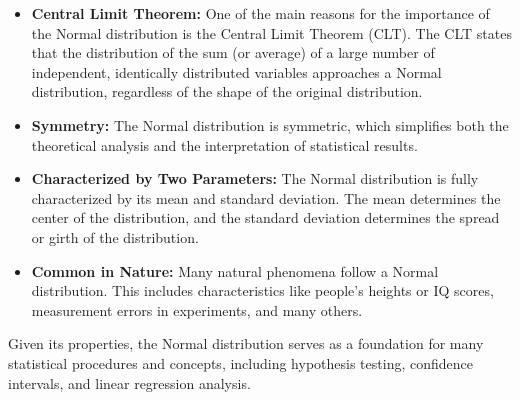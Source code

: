 \begin{itemize}
\item \textbf{Central Limit Theorem:} One of the main reasons for the importance of the Normal distribution is the Central Limit Theorem (CLT). The CLT states that the distribution of the sum (or average) of a large number of independent, identically distributed variables approaches a Normal distribution, regardless of the shape of the original distribution.

\item \textbf{Symmetry:} The Normal distribution is symmetric, which simplifies both the theoretical analysis and the interpretation of statistical results.

\item \textbf{Characterized by Two Parameters:} The Normal distribution is fully characterized by its mean and standard deviation. The mean determines the center of the distribution, and the standard deviation determines the spread or girth of the distribution.

\item \textbf{Common in Nature:} Many natural phenomena follow a Normal distribution. This includes characteristics like people's heights or IQ scores, measurement errors in experiments, and many others.
\end{itemize}

Given its properties, the Normal distribution serves as a foundation for many statistical procedures and concepts, including hypothesis testing, confidence intervals, and linear regression analysis.